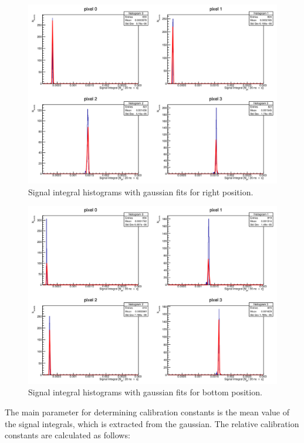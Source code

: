 \begin{figure}[H]
 \centering
 \includegraphics[scale=0.35, angle = 0]{./pictures/right.png}
 \caption{Signal integral histograms with gaussian fits for right position.}
 \label{rightCal}
 
\end{figure}
\begin{figure}[H]
 \centering
 \includegraphics[scale=0.35, angle = 0]{./pictures/bottom.png}
 \caption{Signal integral histograms with gaussian fits for bottom position.}
 \label{bottomCal}
 
\end{figure}


The main parameter for determining calibration constants is the mean value of the signal integrals, which is extracted from the gaussian. The relative calibration constants are calculated as follows:

